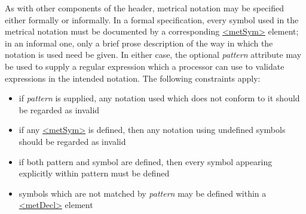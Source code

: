 As with other components of the header, metrical notation may be specified either formally or informally. In a formal specification, every symbol used in the metrical notation must be documented by a corresponding \hyperref[TEI.metSym]{<metSym>} element; in an informal one, only a brief prose description of the way in which the notation is used need be given. In either case, the optional {\itshape pattern} attribute may be used to supply a regular expression which a processor can use to validate expressions in the intended notation. The following constraints apply: \begin{itemize}
\item if {\itshape pattern} is supplied, any notation used which does not conform to it should be regarded as invalid
\item if any \hyperref[TEI.metSym]{<metSym>} is defined, then any notation using undefined symbols should be regarded as invalid
\item if both pattern and symbol are defined, then every symbol appearing explicitly within pattern must be defined
\item symbols which are not matched by {\itshape pattern} may be defined within a \hyperref[TEI.metDecl]{<metDecl>} element
\end{itemize} \par
